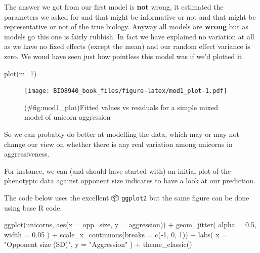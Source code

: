\documentclass[
  12pt,
]{book}
\newenvironment{Shaded}{\begin{snugshade}}{\end{snugshade}}
\newcommand{\AttributeTok}[1]{\textcolor[rgb]{0.77,0.63,0.00}{#1}}
\newcommand{\DecValTok}[1]{\textcolor[rgb]{0.00,0.00,0.81}{#1}}
\newcommand{\FloatTok}[1]{\textcolor[rgb]{0.00,0.00,0.81}{#1}}
\newcommand{\FunctionTok}[1]{\textcolor[rgb]{0.00,0.00,0.00}{#1}}
\newcommand{\NormalTok}[1]{#1}
\newcommand{\SpecialCharTok}[1]{\textcolor[rgb]{0.00,0.00,0.00}{#1}}
\newcommand{\StringTok}[1]{\textcolor[rgb]{0.31,0.60,0.02}{#1}}
\begin{document}
The answer we got from our first model is \textbf{not} wrong, it estimated the parameters we asked for and that might be informative or not and that might be representative or not of the true biology. Anyway all models are \textbf{wrong} but as models go this one is fairly rubbish. In fact we have explained no variation at all as we have no fixed effects (except the mean) and our random effect variance is zero. We woud have seen just how pointless this model was if we'd plotted it

\begin{Shaded}
\begin{Highlighting}[]
\FunctionTok{plot}\NormalTok{(m\_1)}
\end{Highlighting}
\end{Shaded}

\begin{figure}
\centering
\texttt{[image: BIO8940\_book\_files/figure-latex/mod1\_plot-1.pdf]}
\caption{(\#fig:mod1\_plot)Fitted values vs residuals for a simple mixed model of unicorn aggression}
\end{figure}

So we can probably do better at modelling the data, which may or may not change our view on whether there is any real variation among unicorns in aggressiveness.

For instance, we can (and should have started with) an initial plot of the phenotypic data against opponent size indicates to have a look at our prediction.

The code below uses the excellent 📦 \texttt{ggplot2} but the same figure can be done using base R code.

\begin{Shaded}
\begin{Highlighting}[]
\FunctionTok{ggplot}\NormalTok{(unicorns, }\FunctionTok{aes}\NormalTok{(}\AttributeTok{x =}\NormalTok{ opp\_size, }\AttributeTok{y =}\NormalTok{ aggression)) }\SpecialCharTok{+}
  \FunctionTok{geom\_jitter}\NormalTok{(}
    \AttributeTok{alpha =} \FloatTok{0.5}\NormalTok{,}
    \AttributeTok{width =} \FloatTok{0.05}
\NormalTok{  ) }\SpecialCharTok{+}
  \FunctionTok{scale\_x\_continuous}\NormalTok{(}\AttributeTok{breaks =} \FunctionTok{c}\NormalTok{(}\SpecialCharTok{{-}}\DecValTok{1}\NormalTok{, }\DecValTok{0}\NormalTok{, }\DecValTok{1}\NormalTok{)) }\SpecialCharTok{+}
  \FunctionTok{labs}\NormalTok{(}
    \AttributeTok{x =} \StringTok{"Opponent size (SD)"}\NormalTok{,}
    \AttributeTok{y =} \StringTok{"Aggression"}
\NormalTok{  ) }\SpecialCharTok{+}
  \FunctionTok{theme\_classic}\NormalTok{()}
\end{Highlighting}
\end{Shaded}
\end{document}
